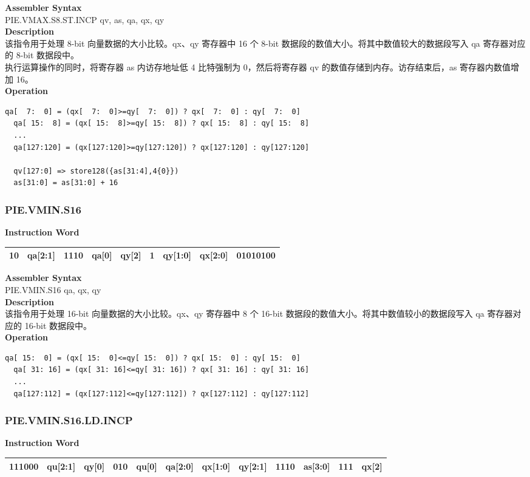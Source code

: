 \textbf{Assembler Syntax} \\
PIE.VMAX.S8.ST.INCP qv, as, qa, qx, qy \\
\textbf{Description} \\
该指令用于处理 8-bit 向量数据的大小比较。qx、qy 寄存器中 16 个 8-bit 数据段的数值大小。将其中数值较大的数据段写入 qa 寄存器对应的 8-bit 数据段中。\\
执行运算操作的同时，将寄存器 as 内访存地址低 4 比特强制为 0，然后将寄存器 qv 的数值存储到内存。访存结束后，as 寄存器内数值增加 16。\\
\textbf{Operation}
\begin{lstlisting}[escapeinside=`?]
  qa[  7:  0] = (qx[  7:  0]>=qy[  7:  0]) ? qx[  7:  0] : qy[  7:  0]
  qa[ 15:  8] = (qx[ 15:  8]>=qy[ 15:  8]) ? qx[ 15:  8] : qy[ 15:  8]
  ...
  qa[127:120] = (qx[127:120]>=qy[127:120]) ? qx[127:120] : qy[127:120]

  qv[127:0] => store128({as[31:4],4{0}})
  as[31:0] = as[31:0] + 16
\end{lstlisting}

\newpage
\subsubsection{PIE.VMIN.S16}\label{instruction:PIEVMINS16}
\setlength\tabcolsep{6pt}
\textbf{Instruction Word} \\
\begin{tabular}{|c|c|c|c|c|c|c|c|c|}
	\hline
	10 & qa[2:1] & 1110 & qa[0] & qy[2] & 1 & qy[1:0] & qx[2:0] & 01010100 \\
	\hline
\end{tabular}

\textbf{Assembler Syntax} \\
PIE.VMIN.S16 qa, qx, qy \\
\textbf{Description} \\
该指令用于处理 16-bit 向量数据的大小比较。qx、qy 寄存器中 8 个 16-bit 数据段的数值大小。将其中数值较小的数据段写入 qa 寄存器对应的 16-bit 数据段中。\\
\textbf{Operation}
\begin{lstlisting}[escapeinside=`?]
  qa[ 15:  0] = (qx[ 15:  0]<=qy[ 15:  0]) ? qx[ 15:  0] : qy[ 15:  0]
  qa[ 31: 16] = (qx[ 31: 16]<=qy[ 31: 16]) ? qx[ 31: 16] : qy[ 31: 16]
  ...
  qa[127:112] = (qx[127:112]<=qy[127:112]) ? qx[127:112] : qy[127:112]
\end{lstlisting}

\newpage
\subsubsection{PIE.VMIN.S16.LD.INCP}\label{instruction:PIEVMINS16LDINCP}
\setlength\tabcolsep{6pt}
\textbf{Instruction Word} \\
\begin{tabular}{|c|c|c|c|c|c|c|c|c|c|c|c|}
	\hline
	111000 & qu[2:1] & qy[0] & 010 & qu[0] & qa[2:0] & qx[1:0] & qy[2:1] & 1110 & as[3:0] & 111 & qx[2] \\
	\hline
\end{tabular}

